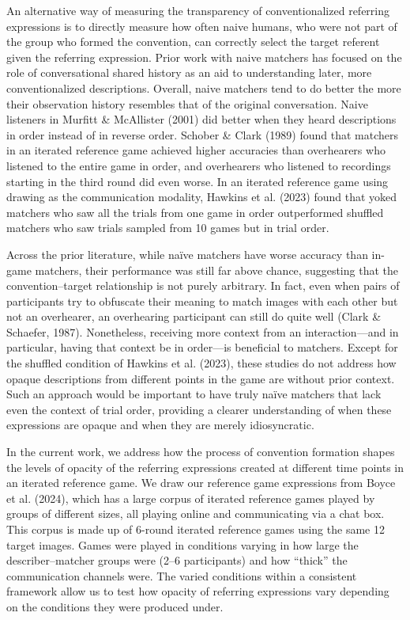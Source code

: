 \documentclass[10pt, letterpaper]{article}
\begin{document}
An alternative way of measuring the transparency of conventionalized
referring expressions is to directly measure how often naive humans, who
were not part of the group who formed the convention, can correctly
select the target referent given the referring expression. Prior work
with naive matchers has focused on the role of conversational shared
history as an aid to understanding later, more conventionalized
descriptions. Overall, naive matchers tend to do better the more their
observation history resembles that of the original conversation. Naive
listeners in Murfitt \& McAllister (2001) did better when they heard
descriptions in order instead of in reverse order. Schober \& Clark
(1989) found that matchers in an iterated reference game achieved higher
accuracies than overhearers who listened to the entire game in order,
and overhearers who listened to recordings starting in the third round
did even worse. In an iterated reference game using drawing as the
communication modality, Hawkins et al. (2023) found that yoked matchers
who saw all the trials from one game in order outperformed shuffled
matchers who saw trials sampled from 10 games but in trial order.

Across the prior literature, while naïve matchers have worse accuracy
than in-game matchers, their performance was still far above chance,
suggesting that the convention--target relationship is not purely
arbitrary. In fact, even when pairs of participants try to obfuscate
their meaning to match images with each other but not an overhearer, an
overhearing participant can still do quite well (Clark \& Schaefer,
1987). Nonetheless, receiving more context from an interaction---and in
particular, having that context be in order---is beneficial to matchers.
Except for the shuffled condition of Hawkins et al. (2023), these
studies do not address how opaque descriptions from different points in
the game are without prior context. Such an approach would be important
to have truly naïve matchers that lack even the context of trial order,
providing a clearer understanding of when these expressions are opaque
and when they are merely idiosyncratic.

In the current work, we address how the process of convention formation
shapes the levels of opacity of the referring expressions created at
different time points in an iterated reference game. We draw our
reference game expressions from Boyce et al. (2024), which has a large
corpus of iterated reference games played by groups of different sizes,
all playing online and communicating via a chat box. This corpus is made
up of 6-round iterated reference games using the same 12 target images.
Games were played in conditions varying in how large the
describer--matcher groups were (2--6 participants) and how ``thick'' the
communication channels were. The varied conditions within a consistent
framework allow us to test how opacity of referring expressions vary
depending on the conditions they were produced under.
\end{document}
